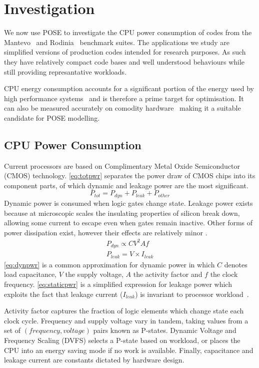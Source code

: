\section{Investigation}
\label{sec:investigation}
We now use POSE to investigate the CPU power consumption of codes from the Mantevo~\cite{heroux:2009aa} and Rodinia~\cite{che:2009aa} benchmark suites.
The applications we study are simplified versions of production codes intended for research purposes.
As such they have relatively compact code bases and well understood behaviours while still providing represantative workloads.

CPU energy consumption accounts for a significant portion of the energy used by high performance systems~\cite{rong:2010aa} and is therefore a prime target for optimisation.
It can also be measured accurately on comodity hardware~\cite{hackenberg:2013aa} making it a suitable candidate for POSE modelling.

\subsection{CPU Power Consumption}
\label{ssec:cpupower}
Current processors are based on Complimentary Metal Oxide Semiconductor (CMOS) technology.
\autoref{eq:totpwr} separates the power draw of CMOS chips into its component parts, of which dynamic and leakage power are the most significant.
\begin{equation}
\label{eq:totpwr}
P_{tot} = P_{dyn} + P_{leak} + P_{other}
\end{equation}
Dynamic power is consumed when logic gates change state.
Leakage power exists because at microscopic scales the insulating properties of silicon break down, allowing some current to escape even when gates remain inactive.
Other forms of power dissipation exist, however their effects are relatively minor \cite{kaxiras:2008aa}.
\begin{gather}
P_{dyn} \propto CV^{2}Af \label{eq:dynpwr} \\
P_{leak} = V\times I_{leak} \label{eq:staticpwr}
\end{gather}
\autoref{eq:dynpwr} is a common approximation for dynamic power in which $C$ denotes load capacitance, $V$ the supply voltage, $A$ the activity factor and $f$ the clock frequency.
\autoref{eq:staticpwr} is a simplified expression for leakage power which exploits the fact that leakage current ($I_{leak}$) is invariant to processor workload~\cite{kim:2003aa}.

Activity factor captures the fraction of logic elements which change state each clock cycle.
Frequency and supply voltage vary in tandem, taking values from a set of $(frequency, voltage)$ pairs known as P-states.
Dynamic Voltage and Frequency Scaling (DVFS) selects a P-state based on workload, or places the CPU into an energy saving mode if no work is available.
Finally, capacitance and leakage current are constants dictated by hardware design.

